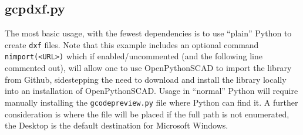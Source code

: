 \documentclass{ltxdoc}
\begin{document}
\subsection{gcpdxf.py}

The most basic usage, with the fewest dependencies is to use ``plain'' Python to create \verb|dxf| files. Note that this example includes an optional command \verb|nimport(<URL>)| which if enabled/uncommented (and the following line commented out), will allow one to use OpenPythonSCAD to import the library from Github, sidestepping the need to download and install the library locally into an installation of OpenPythonSCAD. Usage in  ``normal'' Python will require manually installing the \verb|gcodepreview.py| file where Python can find it. A further consideration is where the file will be placed if the full path is not enumerated, the Desktop is the default destination for Microsoft Windows.
\end{document}
